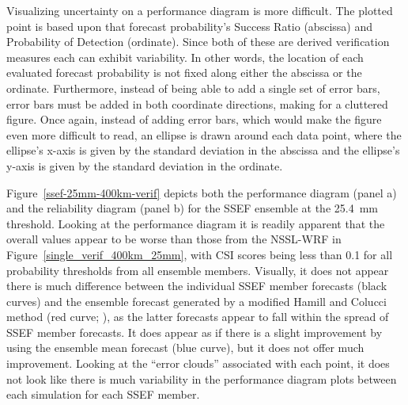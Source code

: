 Visualizing uncertainty on a performance diagram is more difficult.
The plotted point is based upon that forecast probability's Success Ratio (abscissa) and Probability of Detection (ordinate).
Since both of these are derived verification measures each can exhibit variability.
In other words, the location of each evaluated forecast probability is not fixed along either the abscissa or the ordinate.
Furthermore, instead of being able to add a single set of error bars, error bars must be added in both coordinate directions, making for a cluttered figure.
Once again, instead of adding error bars, which would make the figure even more difficult to read, an ellipse is drawn around each data point, where the ellipse's x-axis is given by the standard deviation in the abscissa and the ellipse's y-axis is given by the standard deviation in the ordinate.


\mbox{Figure \ref{ssef-25mm-400km-verif}} depicts both the performance diagram (panel a) and the reliability diagram (panel b) for the SSEF ensemble at the \mbox{25.4 mm} threshold.
Looking at the performance diagram it is readily apparent that the overall values appear to be worse than those from the NSSL-WRF in \mbox{Figure \ref{single_verif_400km_25mm}}, with CSI scores being less than 0.1 for all probability thresholds from all ensemble members.
Visually, it does not appear there is much difference between the individual SSEF member forecasts (black curves) and the ensemble forecast generated by a modified Hamill and Colucci method (red curve; \citealp{Hamill1998, Clark2009}), as the latter forecasts appear to fall within the spread of SSEF member forecasts.
It does appear as if there is a slight improvement by using the ensemble mean forecast (blue curve), but it does not offer much improvement.
Looking at the ``error clouds'' associated with each point, it does not look like there is much variability in the performance diagram plots between each simulation for each SSEF member.


